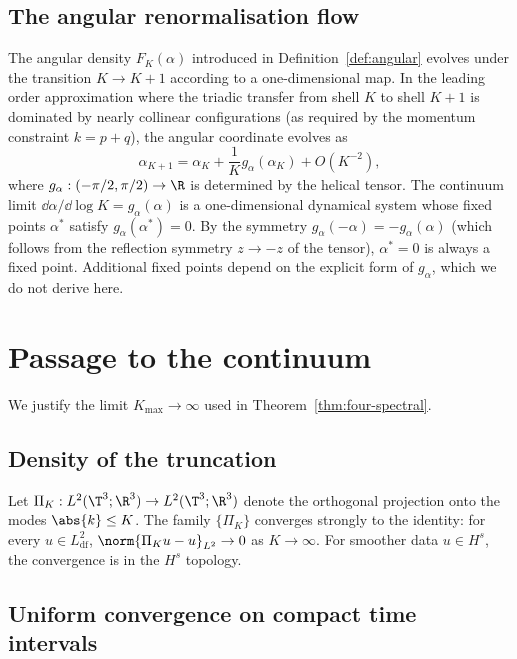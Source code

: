 \subsection{The angular renormalisation flow}
\label{app:angular-flow}

The angular density $F_K(\alpha)$ introduced in 
Definition~\ref{def:angular} evolves under the transition $K\to K+1$ 
according to a one-dimensional map. In the leading order 
approximation where the triadic transfer from shell $K$ to shell 
$K+1$ is dominated by nearly collinear configurations (as required 
by the momentum constraint $k = p+q$), the angular coordinate evolves 
as
\begin{equation}\label{eq:angular-flow}
\alpha_{K+1} = \alpha_K + \frac{1}{K}g_\alpha(\alpha_K) + O(K^{-2}),
\end{equation}
where $g_\alpha: (-\pi/2,\pi/2)\to\R$ is determined by the helical 
tensor. The continuum limit $\dd\alpha/\dd\log K = g_\alpha(\alpha)$ 
is a one-dimensional dynamical system whose fixed points 
$\alpha^\ast$ satisfy $g_\alpha(\alpha^\ast)=0$. By the symmetry 
$g_\alpha(-\alpha) = -g_\alpha(\alpha)$ (which follows from the 
reflection symmetry $z\to -z$ of the tensor), $\alpha^\ast = 0$ is 
always a fixed point. Additional fixed points depend on the explicit 
form of $g_\alpha$, which we do not derive here.

\section{Passage to the continuum}
\label{app:limit}

We justify the limit $K_{\max}\to\infty$ used in 
Theorem~\ref{thm:four-spectral}.

\subsection{Density of the truncation}
\label{app:density}

Let $\Pi_K : L^2(\T^3;\R^3)\to L^2(\T^3;\R^3)$ denote the orthogonal 
projection onto the modes $\abs{k}\leq K$. The family $\{\Pi_K\}$ 
converges strongly to the identity: for every 
$u\in L^2_{\mathrm{df}}$, $\norm{\Pi_K u - u}_{L^2}\to 0$ as 
$K\to\infty$. For smoother data $u\in H^s$, the convergence is in 
the $H^s$ topology.

\subsection{Uniform convergence on compact time intervals}
\label{app:uniform}


